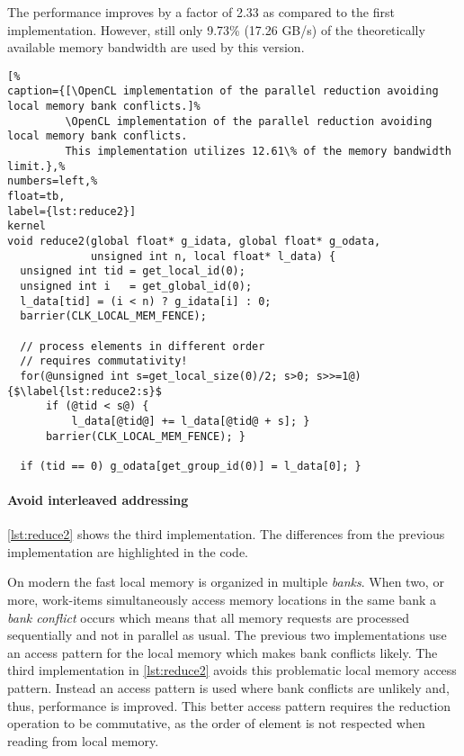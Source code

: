 The performance improves by a factor of 2.33 as compared to the first implementation.
However, still only 9.73\% (17.26 GB/s) of the theoretically available memory bandwidth are used by this version.


\FloatBarrier
\begin{lstlisting}[%
caption={[\OpenCL implementation of the parallel reduction avoiding local memory bank conflicts.]%
         \OpenCL implementation of the parallel reduction avoiding local memory bank conflicts.
         This implementation utilizes 12.61\% of the memory bandwidth limit.},%
numbers=left,%
float=tb,
label={lst:reduce2}]
kernel
void reduce2(global float* g_idata, global float* g_odata,
             unsigned int n, local float* l_data) {
  unsigned int tid = get_local_id(0);
  unsigned int i   = get_global_id(0);
  l_data[tid] = (i < n) ? g_idata[i] : 0;
  barrier(CLK_LOCAL_MEM_FENCE);

  // process elements in different order
  // requires commutativity!
  for(@unsigned int s=get_local_size(0)/2; s>0; s>>=1@) {$\label{lst:reduce2:s}$
      if (@tid < s@) {
          l_data[@tid@] += l_data[@tid@ + s]; }
      barrier(CLK_LOCAL_MEM_FENCE); }

  if (tid == 0) g_odata[get_group_id(0)] = l_data[0]; }
\end{lstlisting}

\paragraph{Avoid interleaved addressing}

\autoref{lst:reduce2} shows the third implementation.
The differences from the previous implementation are highlighted in the code.

On modern \GPUs the fast local memory is organized in multiple \emph{banks}.
When two, or more, work-items simultaneously access memory locations in the same bank a \emph{bank conflict} occurs which means that all memory requests are processed sequentially and not in parallel as usual.
The previous two implementations use an access pattern for the local memory which makes bank conflicts likely.
The third implementation in \autoref{lst:reduce2} avoids this problematic local memory access pattern.
Instead an access pattern is used where bank conflicts are unlikely and, thus, performance is improved.
This better access pattern requires the reduction operation to be commutative, as the order of element is not respected when reading from local memory.

